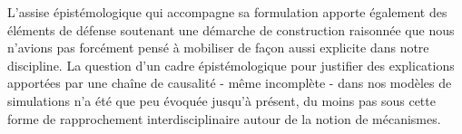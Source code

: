 L'assise épistémologique qui accompagne sa formulation apporte également des éléments de défense soutenant une démarche de construction raisonnée que nous n'avions pas forcément pensé à mobiliser de façon aussi explicite dans notre discipline. La question d'un cadre épistémologique pour justifier des explications apportées par une chaîne de causalité - même incomplète - dans nos modèles de simulations n'a été que peu évoquée jusqu'à présent, du moins pas sous cette forme de rapprochement interdisciplinaire autour de la notion de mécanismes. 




